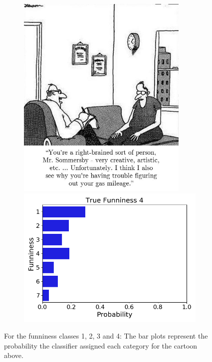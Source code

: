 \documentclass[draft,final,oneside]{vutinfth} %
\begin{document}
\begin{figure}
\begin{subfigure}[b]{0.45\textwidth}
\end{subfigure}\quad
\begin{subfigure}[b]{0.45\textwidth}
\centering
\includegraphics[width=0.9\textwidth,height=0.3\textheight,keepaspectratio]{graphics/detail/Test_for_Image_4_cartoon} \\
\includegraphics[width=1.0\textwidth]{graphics/detail/Test_for_Image_4}
\end{subfigure}

\caption{For the funniness classes 1, 2, 3 and 4: The bar plots represent the probability the classifier assigned each category for the cartoon above.}

\label{fig:figdistr1}

\end{figure}
\end{document}
